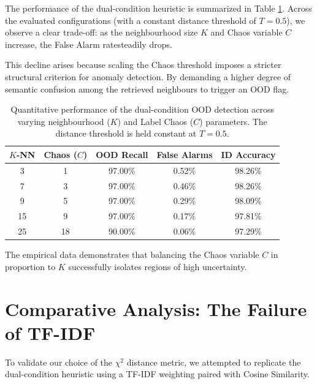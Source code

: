 \documentclass[oneside]{ctuthesis}
\begin{document}
\vfill
\newpage

The performance of the dual-condition heuristic is summarized in Table \ref{tab:ood_performance_metrics}. Across the evaluated configurations (with a constant distance threshold of $T=0.5$), we observe a clear trade-off: as the neighbourhood size $K$ and Chaos variable $C$ increase, the False Alarm ratesteadily drops.

This decline arises because scaling the Chaos threshold imposes a stricter structural criterion for anomaly detection. By demanding a higher degree of semantic confusion among the retrieved neighbours to trigger an OOD flag.

\begin{table}[htbp]
    \centering
    \begin{tabular}{@{}c c c c c@{}}
        \toprule
        \textbf{$K$-NN} & \textbf{Chaos ($C$)} & \textbf{OOD Recall} & \textbf{False Alarms} & \textbf{ID Accuracy} \\
        \midrule
        3  & 1  & 97.00\% & 0.52\% & 98.26\% \\
        7  & 3  & 97.00\% & 0.46\% & 98.26\% \\
        9  & 5  & 97.00\% & 0.29\% & 98.09\% \\
        15 & 9  & 97.00\% & 0.17\% & 97.81\% \\
        25 & 18 & 90.00\% & 0.06\% & 97.29\% \\
        \bottomrule
    \end{tabular}
    \caption{Quantitative performance of the dual-condition OOD detection across varying neighbourhood ($K$) and Label Chaos ($C$) parameters. The distance threshold is held constant at $T=0.5$.}
    \label{tab:ood_performance_metrics}
\end{table}

The empirical data demonstrates that balancing the Chaos variable $C$ in proportion to $K$ successfully isolates regions of high uncertainty.

\section{Comparative Analysis: The Failure of TF-IDF}
\label{sec:ood_tfidf_failure}

To validate our choice of the $\chi^2$ distance metric, we attempted to replicate the dual-condition heuristic using a TF-IDF weighting paired with Cosine Similarity. 
\end{document}
